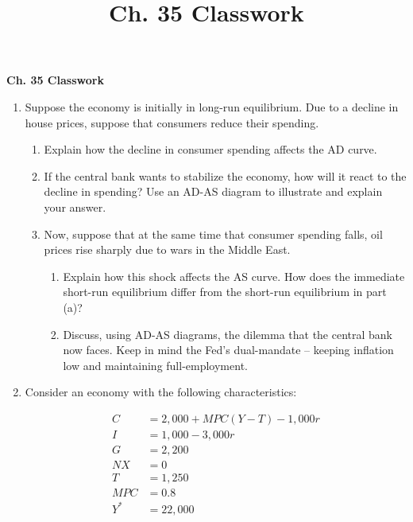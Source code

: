 \documentclass{article}
\title{Ch. 35 Classwork}
\begin{document}
\begin{center}
\textbf{{\Large Ch. 35 Classwork}} 

\bigskip

\end{center}

\begin{enumerate}

\item Suppose the economy is initially in long-run equilibrium. Due to a decline in house prices, suppose that consumers reduce their spending.

	\begin{enumerate}
	
	\item Explain how the decline in consumer spending affects the AD curve.
	
	\item If the central bank wants to stabilize the economy, how will it react to the decline in spending? Use an AD-AS diagram to illustrate and explain your answer.
	
	\item Now, suppose that at the same time that consumer spending falls, oil prices rise sharply due to wars in the Middle East.
	
		\begin{enumerate}
		
		\item Explain how this shock affects the AS curve. How does the immediate short-run equilibrium differ from the short-run equilibrium in part (a)?
		
		\item Discuss, using AD-AS diagrams, the dilemma that the central bank now faces. Keep in mind the Fed's dual-mandate -- keeping inflation low and maintaining full-employment.
		
		\end{enumerate}
	
	\end{enumerate}
	
\item Consider an economy with the following characteristics:

	\begin{align*}
	C &= 2,000 + MPC(Y - T) - 1,000r \\
	I &= 1,000 - 3,000r \\
	G &= 2,200 \\
	NX &= 0 \\
	T &= 1,250 \\
	MPC &= 0.8 \\
	Y^* &= 22,000
	\end{align*}
	

\end{enumerate}
\end{document}
